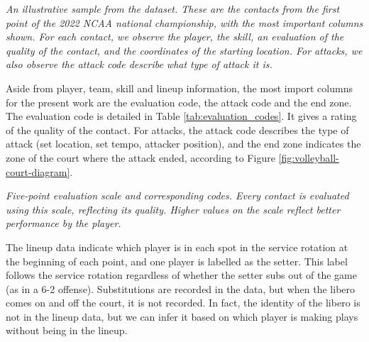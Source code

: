 \documentclass{article}
\begin{document}
\begin{table}[hb]
    \centering
    
    \caption{\it An illustrative sample from the dataset. These are the contacts from the first point of the 2022 NCAA national championship, with the most important columns shown. For each contact, we observe the player, the skill, an evaluation of the quality of the contact, and the coordinates of the starting location. For attacks, we also observe the attack code describe what type of attack it is.}
    \label{tab:sample-data}
\end{table}

Aside from player, team, skill and lineup information, the most import columns for the present work are the evaluation code, the attack code and the end zone. The evaluation code is detailed in Table \ref{tab:evaluation_codes}. It gives a rating of the quality of the contact. For attacks, the attack code describes the type of attack (set location, set tempo, attacker position), and the end zone indicates the zone of the court where the attack ended, according to Figure \ref{fig:volleyball-court-diagram}.

\begin{table}
    \centering
    
    \caption{\it Five-point evaluation scale and corresponding codes. Every contact is evaluated using this scale, reflecting its quality. Higher values on the scale reflect better performance by the player.}
    \label{tab:evaluation_codes}
\end{table}

The lineup data indicate which player is in each spot in the service rotation at the beginning of each point, and one player is labelled as the setter. This label follows the service rotation regardless of whether the setter subs out of the game (as in a 6-2 offense). Substitutions are recorded in the data, but when the libero comes on and off the court, it is not recorded. In fact, the identity of the libero is not in the lineup data, but we can infer it based on which player is making plays without being in the lineup.
\end{document}
